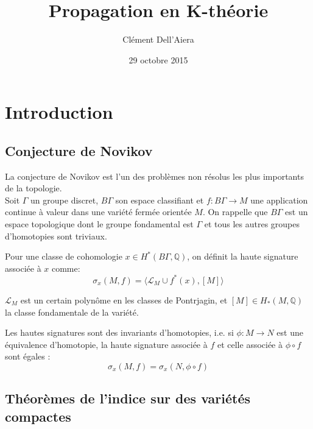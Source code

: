 \documentclass{beamer}
\title{Propagation en K-théorie}
\author{Clément Dell'Aiera}
\institute{IECL}
\date{29 octobre 2015}
\begin{document}
\begin{frame}
\titlepage
\end{frame}

\begin{frame}
\tableofcontents
\end{frame}

\section{Introduction}

\subsection{Conjecture de Novikov}

\begin{frame}
La conjecture de Novikov est l'un des problèmes non résolus les plus importants de la topologie.\\
Soit $\Gamma$ un groupe discret, $B\Gamma$ son espace classifiant et $f: B\Gamma\rightarrow M$ une application continue à valeur dans une variété fermée orientée $M$. On rappelle que $B\Gamma$ est un espace topologique dont le groupe fondamental est $\Gamma$ et tous les autres groupes d'homotopies sont triviaux. \\
\begin{definition}
Pour une classe de cohomologie $x\in H^*(B\Gamma,\mathbb Q)$, on définit la haute signature associée à $x$ comme:
\[\sigma_x(M,f) = \langle \mathcal L_M \cup f^*(x), [M]\rangle\] 
\end{definition}

$\mathcal L_M$ est un certain polynôme en les classes de Pontrjagin, et $[M]\in H_*(M,\mathbb Q)$ la classe fondamentale de la variété.
\end{frame}

\begin{frame}
\begin{conj}[Novikov]
Les hautes signatures sont des invariants d'homotopies, i.e. si $\phi : M\rightarrow N$ est une équivalence d'homotopie, la haute signature associée à $f$ et celle associée à $\phi\circ f$ sont égales :
\[\sigma_x(M,f)=\sigma_x(N,\phi\circ f)\]
\end{conj}
\end{frame}

\subsection{Théorèmes de l'indice sur des variétés compactes}
\end{document}
